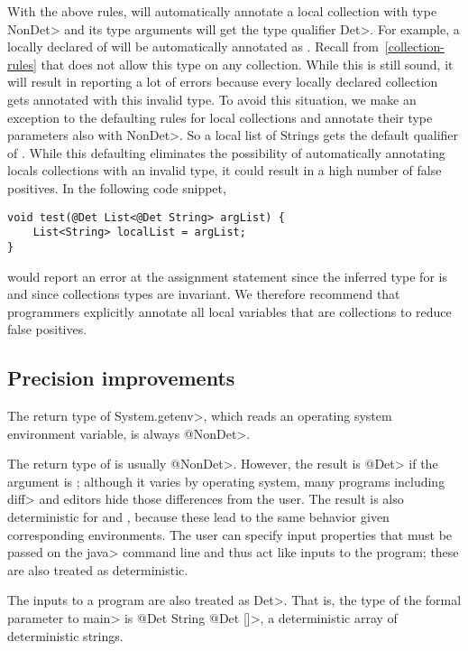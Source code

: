 With the above rules, \theDeterminismChecker will automatically annotate a local collection with type \<NonDet> and its
type arguments will get the type qualifier \<Det>. For example, a locally declared  of  will be automatically annotated
as . Recall from~\cref{collection-rules} that \theDeterminismChecker does not allow this type on
any collection. While this is still sound, it will result in \theDeterminismChecker reporting a lot of errors because every locally declared 
collection gets annotated with this invalid type. To avoid this situation, we make an exception to the defaulting rules for local collections
and annotate their type parameters also with \<NonDet>. So a local list of Strings gets the default qualifier of . While this defaulting eliminates the possibility of automatically annotating locals collections with an invalid
type, it could result in a high number of false positives. In the following code snippet,
\begin{verbatim}
void test(@Det List<@Det String> argList) {
    List<String> localList = argList;
}    
\end{verbatim}
\theDeterminismChecker would report an error at the assignment statement since the inferred type for  is 
 and since collections types are invariant.
We therefore recommend that programmers explicitly annotate
all local variables that are collections to reduce false positives.

\subsection{Precision improvements}\label{sec:precision-java}

The return type of \<System.getenv>, which reads an operating system
environment variable, is always \<@NonDet>.

The return type of  is usually \<@NonDet>. However,
the result is \<@Det> if the argument is ; although
it varies by operating system, many programs including \<diff> and editors hide those
differences from the user.
The result is also deterministic for  and
, because these lead to the same behavior given
corresponding environments.
The user can specify input properties that must be passed on the \<java>
command line and thus act like inputs to the program; these are also
treated as deterministic.

The inputs to a program are also treated as \<Det>.  That is, the type of
the formal parameter to \<main> is
\<@Det String @Det []>, a deterministic array of deterministic strings.

